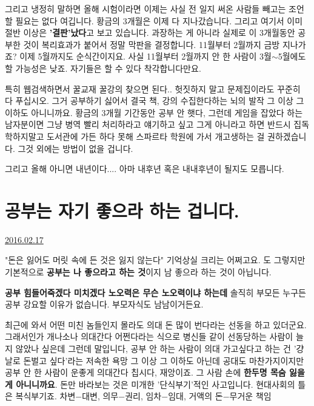 그리고 냉정히 말하면 올해 시험이라면 이제는 사실 전 일지 써온 사람들 빼고는 조언할 필요는 없다 여깁니다.
황금의 3개월은 이제 다 지나갔습니다. 그리고 여기서 이미 절반 이상은 \textbf{'결판'났다}고 보고 있습니다.
과장하는 게 아니라 실제로 이 3개월동안 공부한 것이 복리효과가 붙어서 정말 막판을 결정합니다.
11월부터 2월까지 금방 지나가죠? 이제 5월까지도 순식간이지요.
사실 11월부터 2월까지 안 한 사람이 3월$\sim$5월에도 할 가능성은 낮죠.
자기들은 할 수 있다 착각합니다만요.
\vspace{5mm}

특히 웹검색하면서 꿀교재 꿀강의 찾으면 된다..
헛짓하지 말고 문제집이라도 꾸준히 다 푸십시오. 그거 공부하기 싫어서 결국 책, 강의 수집한다하는 뇌의 발작 그 이상 그 이하도 아니니까요.
황금의 3개월 기간동안 공부 안 햇다, 그런데 게임을 잡았다 하는 남자분이면 그냥 병역 빨리 처리하라고 얘기하고 싶고
그게 아니라고 하면 반드시 집독학하지말고 도서관에 가든 하다 못해 스파르타 학원에 가서 개고생하는 걸 권하겠습니다.
그것 외에는 방법이 없을 겁니다.
\vspace{5mm}

그리고 올해 아니면 내년이다.... 아마 내후년 혹은 내내후년이 될지도 모릅니다.
\vspace{5mm}






\section{공부는 자기 좋으라 하는 겁니다.}
\href{https://www.kockoc.com/Apoc/639054}{2016.02.17}

\vspace{5mm}

"돈은 잃어도 머릿 속에 든 것은 잃지 않는다" 기억상실 크리는 어쩌고요.
도 그렇지만 기본적으로 \textbf{공부는 나 좋으라고 하는 것}이지 남 좋으라 하는 것이 아닙니다.
\vspace{5mm}

\textbf{공부 힘들어죽겠다 미치겠다 노오력은 무슨 노오력이냐 하는데}
솔직히 부모든 누구든 공부 강요할 이유가 없습니다. 부모자식도 남남이거든요.
\vspace{5mm}

최근에 와서 어떤 미친 놈들인지 몰라도 의대 돈 많이 번다라는 선동을 하고 있더군요.
그래서인가 개나소나 의대간다 어쩐다라는 식으로 병신들 같이 선동당하는 사람이 늘지 않았나 싶은데
그런데 말입니다, 공부 안 하는 사람이 의대 가고싶다고 하는 건 '걍 날로 돈벌고 싶다'라는 저속한 욕망 그 이상 그 이하도 아닌데
공대도 마찬가지이지만 공부 안 한 사람이 운좋게 의대간다 칩시다, 재앙이죠. 그 사람 손에 \textbf{한두명 목숨 잃을 게 아니니까요}.
돈만 바라보는 것은 미개한 '단식부기'적인 사고입니다.
현대사회의 틀은 복식부기죠. 차변$-$대변, 의무$-$권리, 임차$-$임대, 거액의 돈$-$무거운 책임
\vspace{5mm}

